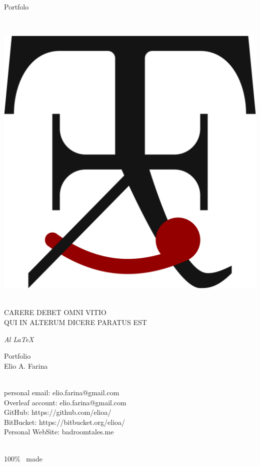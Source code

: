 

    \null
    \vfill
    \begin{center}
        {\fontsize{50pt}{20pt}\selectfont\color{COLV}Portfol\blackcolouri o}\\
        \strut\\
    \end{center}
    \vfill
    \begin{center}
    \includegraphics[width=0.3\linewidth]{./TikZimages/logoofficial.pdf}\\
    {\small\trjnfamily \strut\\ CARERE DEBET OMNI VITIO\\ QUI IN ALTERUM DICERE PARATUS EST}
    \end{center}

    \clearpage
    \begin{flushright}
        \textit{\huge Al \LaTeX}
    \end{flushright}
        \vfill
    \begin{center}
    \end{center}
        \vfill
    \begin{flushright}
        \huge
        Portfolio\\
        Elio A. Farina\\
        \LARGE
        \strut\\
        personal email: elio.farina@gmail.com\\
        Overleaf account: elio.farina@gmail.com\\
        GitHub: https://github.com/elioa/\\
        BitBucket: https://bitbucket.org/elioa/\\
        Personal WebSite: badroomtales.me\\
        \strut\\
        100\% \LaTeXe\ made
    \end{flushright}

